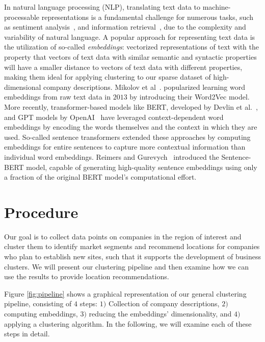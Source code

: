 \documentclass[12pt]{article}
\begin{document}
   In natural language processing (NLP), translating text data to machine-processable representations is a fundamental challenge for numerous tasks, such as sentiment analysis~\cite{rezaeinia2019sentiment}, and information retrieval~\cite{ye2016word}, due to the complexity and variability of natural language. A popular approach for representing text data is the utilization of so-called \emph{embeddings}: vectorized representations of text with the property that vectors of text data with similar semantic and syntactic properties will have a smaller distance to vectors of text data with different properties, making them ideal for applying clustering to our sparse dataset of high-dimensional company descriptions.  
   Mikolov et al~\cite{mikolov2013efficient}. popularized learning word embeddings from raw text data in $2013$ by introducing their Word2Vec model. More recently, transformer-based models like BERT, developed by Devlin et al.~\cite{devlin2018bert}, and GPT models by OpenAI~\cite{radford2018improving, chatgpt} have leveraged context-dependent word embeddings by encoding the words themselves and the context in which they are used. So-called sentence transformers extended these approaches by computing embeddings for entire sentences to capture more contextual information than individual word embeddings. Reimers and Gurevych~\cite{reimers2019sentence} introduced the Sentence-BERT model, capable of generating high-quality sentence embeddings using only a fraction of the original BERT model's computational effort.
   
   \section*{Procedure}
   
   Our goal is to collect data points on companies in the region of interest and cluster them to identify market segments and recommend locations for companies who plan to establish new sites, such that it supports the development of business clusters. We will present our clustering pipeline and then examine how we can use the results to provide location recommendations. 
   
   Figure \ref{fig:pipeline} shows a graphical representation of our general clustering pipeline, consisting of $4$ steps: $1)$ Collection of company descriptions, $2)$ computing embeddings, $3)$ reducing the embeddings' dimensionality, and $4)$ applying a clustering algorithm. In the following, we will examine each of these steps in detail.
   
\end{document}
